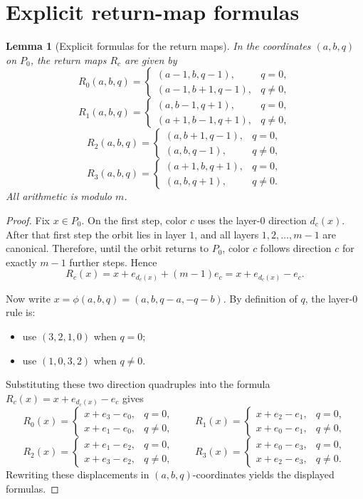 \documentclass[11pt]{article}
\newtheorem{lemma}{Lemma}
\theoremstyle{definition}
\theoremstyle{remark}
\begin{document}
\section{Explicit return-map formulas}

\begin{lemma}[Explicit formulas for the return maps]\label{lem:return-formulas}
In the coordinates $(a,b,q)$ on $P_0$, the return maps $R_c$ are given by
\[
R_0(a,b,q)=
\begin{cases}
(a-1,b,q-1), & q=0,\\
(a-1,b+1,q-1), & q\neq 0,
\end{cases}
\]
\[
R_1(a,b,q)=
\begin{cases}
(a,b-1,q+1), & q=0,\\
(a+1,b-1,q+1), & q\neq 0,
\end{cases}
\]
\[
R_2(a,b,q)=
\begin{cases}
(a,b+1,q-1), & q=0,\\
(a,b,q-1), & q\neq 0,
\end{cases}
\]
\[
R_3(a,b,q)=
\begin{cases}
(a+1,b,q+1), & q=0,\\
(a,b,q+1), & q\neq 0.
\end{cases}
\]
All arithmetic is modulo $m$.
\end{lemma}

\begin{proof}
Fix $x\in P_0$. On the first step, color $c$ uses the layer-$0$ direction $d_c(x)$. After that first step the orbit lies in layer $1$, and all layers $1,2,\dots,m-1$ are canonical. Therefore, until the orbit returns to $P_0$, color $c$ follows direction $c$ for exactly $m-1$ further steps. Hence
\[
R_c(x)=x+e_{d_c(x)}+(m-1)e_c=x+e_{d_c(x)}-e_c.
\]

Now write $x=\phi(a,b,q)=(a,b,q-a,-q-b)$. By definition of $q$, the layer-$0$ rule is:
\begin{itemize}
    \item use $(3,2,1,0)$ when $q=0$;
    \item use $(1,0,3,2)$ when $q\neq 0$.
\end{itemize}
Substituting these two direction quadruples into the formula $R_c(x)=x+e_{d_c(x)}-e_c$ gives
\[
R_0(x)=
\begin{cases}
x+e_3-e_0, & q=0,\\
x+e_1-e_0, & q\neq 0,
\end{cases}
\qquad
R_1(x)=
\begin{cases}
x+e_2-e_1, & q=0,\\
x+e_0-e_1, & q\neq 0,
\end{cases}
\]
\[
R_2(x)=
\begin{cases}
x+e_1-e_2, & q=0,\\
x+e_3-e_2, & q\neq 0,
\end{cases}
\qquad
R_3(x)=
\begin{cases}
x+e_0-e_3, & q=0,\\
x+e_2-e_3, & q\neq 0.
\end{cases}
\]
Rewriting these displacements in $(a,b,q)$-coordinates yields the displayed formulas.
\end{proof}
\end{document}
